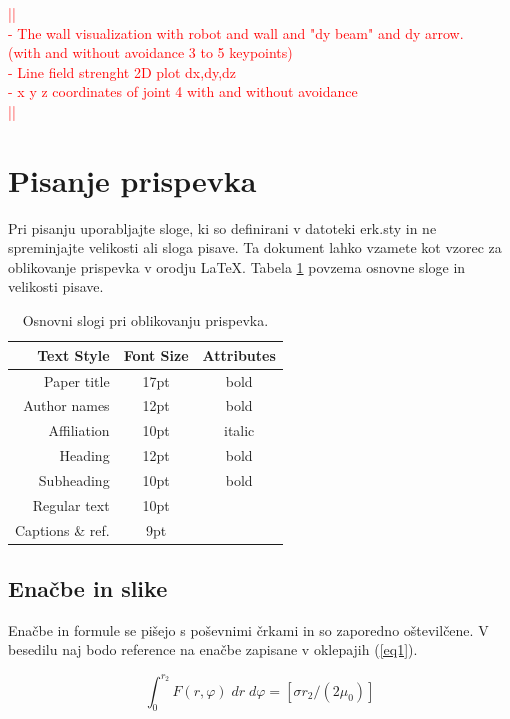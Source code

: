 \documentclass[a4paper]{article}
\newcommand\todocomment[1]{\textcolor{red}{||\\ #1\\||}}
\begin{document}
\todocomment{- The wall visualization with robot and wall and "dy beam" and dy arrow. \\
				(with and without avoidance 3 to 5 keypoints) \\
			 - Line field strenght 2D plot dx,dy,dz \\
			 - x y z coordinates of joint 4 with and without avoidance
		 	  }

\section{Pisanje prispevka}

Pri pisanju uporabljajte sloge, ki so definirani v datoteki erk.sty in ne spreminjajte velikosti ali sloga pisave. Ta dokument lahko vzamete kot vzorec za oblikovanje prispevka v orodju \LaTeX.
Tabela \ref{tab1} povzema osnovne sloge in velikosti pisave.

\begin{table}[h]
\caption{Osnovni slogi pri oblikovanju prispevka.} \label{tab1}
\smallskip
\begin{center}
\begin{tabular}{ | r | c | c | }
\hline  
  \textbf{Text Style} & \textbf{Font Size} & \textbf{Attributes}\\ 
\hline  
  Paper title & 17pt & bold\\
  Author names & 12pt & bold\\
  Affiliation & 10pt & italic\\
  Heading & 12pt & bold \\
  Subheading & 10pt & bold\\
  Regular text & 10pt &\\
  Captions \& ref. & 9pt &\\
\hline  
\end{tabular}
\end{center}
\end{table}

\subsection{Enačbe in slike}

Enačbe in formule se pišejo s poševnimi črkami in so zaporedno oštevilčene. V besedilu naj bodo reference na enačbe zapisane v oklepajih (\ref{eq1}).

\begin{equation}
 \int^{r_{2}}_{0}F(r,\varphi)\; dr\; d\varphi= [\sigma r_{2} / (2\mu_{0})]
    \label{eq1}
\end{equation}
\end{document}
